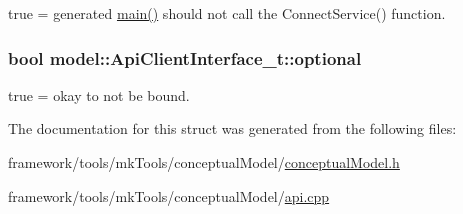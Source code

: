 true = generated \hyperlink{start_8c_a3c04138a5bfe5d72780bb7e82a18e627}{main()} should not call the Connect\+Service() function. 

\subsubsection[{\texorpdfstring{optional}{optional}}]{\setlength{\rightskip}{0pt plus 5cm}bool model\+::\+Api\+Client\+Interface\+\_\+t\+::optional}\hypertarget{structmodel_1_1_api_client_interface__t_aa3767aa67402c190a8fbc5d7202ff403}{}\label{structmodel_1_1_api_client_interface__t_aa3767aa67402c190a8fbc5d7202ff403}


true = okay to not be bound. 



The documentation for this struct was generated from the following files\+:\begin{DoxyCompactItemize}
\item 
framework/tools/mk\+Tools/conceptual\+Model/\hyperlink{conceptual_model_8h}{conceptual\+Model.\+h}\item 
framework/tools/mk\+Tools/conceptual\+Model/\hyperlink{api_8cpp}{api.\+cpp}\end{DoxyCompactItemize}
